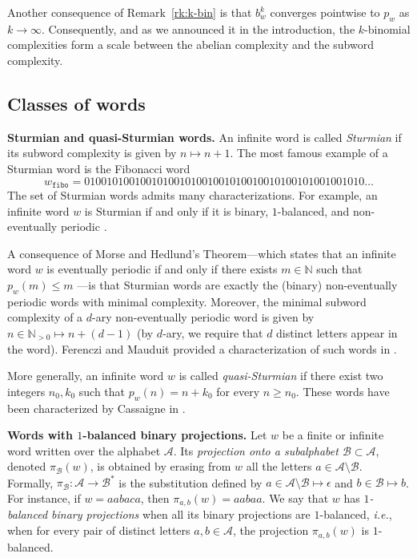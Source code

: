 \documentclass{template_arxiv}
\theoremstyle{definition}
\newcommand{\N}{\mathbb{N}}
\newcommand{\A}{\mathcal{A}}
\newcommand{\B}{\mathcal{B}}
\begin{document}
Another consequence of Remark~\ref{rk:k-bin} is that $b_w^k$ converges pointwise to $p_w$ as $k\to\infty$. Consequently, and as we announced it in the introduction, the $k$-binomial complexities form a scale between the abelian complexity and the subword complexity.

\subsection{Classes of words}

\noindent\textbf{Sturmian and quasi-Sturmian words.} An infinite word is called \emph{Sturmian} if its subword complexity is given by $n\mapsto n+1$. The most famous example of a Sturmian word is the Fibonacci word
\[
    w_{\mathtt{fibo}}=010 01 010 010 01 010 01 010 010 01 010 010 01 010 01 010 010 01 010\ldots
\]
The set of Sturmian words admits many characterizations. For example, an infinite word $w$ is Sturmian if and only if it is binary, $1$-balanced, and non-eventually periodic \cite{MH40}.

A consequence of Morse and Hedlund's Theorem---which states that an infinite word $w$ is eventually periodic if and only if there exists $m\in\N$ such that $p_w(m)\leq m$ \cite{MH38}---is that Sturmian words are exactly the (binary) non-eventually periodic words with minimal complexity. Moreover, the minimal subword complexity of a $d$-ary non-eventually periodic word is given by $n\in\N_{>0}\mapsto n+(d-1)$ (by $d$-ary, we require that $d$ distinct letters appear in the word). Ferenczi and Mauduit provided a characterization of such words in \cite[Lemma~1 and Lemma~4]{FM97}.

More generally, an infinite word $w$ is called \emph{quasi-Sturmian} if there exist two integers $n_0,k_0$ such that $p_w(n)=n+k_0$ for every $n\geq n_0$. These words have been characterized by Cassaigne in \cite[Proposition~8]{Cas97}.

\bigskip

\noindent\textbf{Words with $1$-balanced binary projections.} Let $w$ be a finite or infinite word written over the alphabet $\A$. Its \emph{projection onto a subalphabet $\B\subset\A$}, denoted $\pi_\B(w)$, is obtained by erasing from $w$ all the letters $a\in\A\setminus\B$. Formally, $\pi_\B:\A\to\B^*$ is the substitution defined by $a\in\A\setminus\B\mapsto\epsilon$ and $b\in\B\mapsto b$. For instance, if $w=aabaca$, then $\pi_{a,b}(w)=aabaa$. We say that $w$ has \emph{$1$-balanced binary projections} when all its binary projections are $1$-balanced, \emph{i.e.}, when for every pair of distinct letters $a,b\in\A$, the projection $\pi_{a,b}(w)$ is $1$-balanced.
\end{document}
